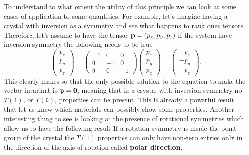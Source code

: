 \noindent
To understand to what extent the utility of this principle we can look at some cases of application to some quantities. For example, let's imagine having a crystal with inversion as a symmetry and see what happens to rank ones tensors. Therefore, let's assume to have the tensor $\vb{p} = (p_x, p_y, p_z)$ if the system have inversion symmetry the following needs to be true
\begin{equation}
    \begin{pmatrix}
        p_x\\
        p_y\\
        p_z
    \end{pmatrix} = \begin{pmatrix}
        -1 & 0 & 0\\
        0  &-1 & 0\\
        0  & 0 &-1
    \end{pmatrix}
    \begin{pmatrix}
        p_x\\
        p_y\\
        p_z
    \end{pmatrix} = \begin{pmatrix}
        -p_x\\
        -p_y\\
        -p_z
    \end{pmatrix}.
\end{equation}
This clearly makes so that the only possible solution to the equation to make the vector invariant is $\vb{p} = \vb{0}$, meaning that in a crystal with inversion symmetry no $T(1)$, or $T(0)$, properties can be present. This is already a powerful result that let us know which materials can possibly show some properties. Another interesting thing to see is looking at the presence of rotational symmetries which allow us to have the following result
\cor{}
{
    If a rotation symmetry is inside the point group of the crystal the $T(1)$ properties can only have non-zero entries only in the direction of the axis of rotation called \textbf{polar direction}.
}
